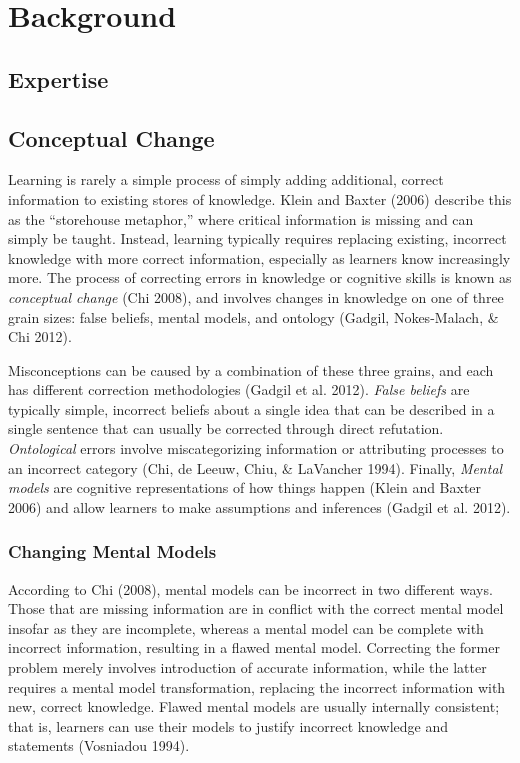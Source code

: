\documentclass{book}
\begin{document}
\chapter{Background}

\section{Expertise}


\section{Conceptual Change}

Learning is rarely a simple process of simply adding additional, correct information to existing stores of knowledge. Klein and Baxter (2006) describe this as the ``storehouse metaphor,'' where critical information is missing and can simply be taught. Instead, learning typically requires replacing existing, incorrect knowledge with more correct information, especially as learners know increasingly more. The process of correcting errors in knowledge or cognitive skills is known as \emph{conceptual change} (Chi 2008), and involves changes in knowledge on one of three grain sizes: false beliefs, mental models, and ontology (Gadgil, Nokes-Malach, & Chi 2012).

Misconceptions can be caused by a combination of these three grains, and each has different correction methodologies (Gadgil et al. 2012). \emph{False beliefs} are typically simple, incorrect beliefs about a single idea that can be described in a single sentence that can usually be corrected through direct refutation. \emph{Ontological} errors involve miscategorizing information or attributing processes to an incorrect category (Chi, de Leeuw, Chiu, & LaVancher 1994). Finally, \emph{Mental models} are cognitive representations of how things happen (Klein and Baxter 2006) and allow learners to make assumptions and inferences (Gadgil et al. 2012).

\subsection{Changing Mental Models}

According to Chi (2008), mental models can be incorrect in two different ways. Those that are missing information are in conflict with the correct mental model insofar as they are incomplete, whereas a mental model can be complete with incorrect information, resulting in a flawed mental model. Correcting the former problem merely involves introduction of accurate information, while the latter requires a mental model transformation, replacing the incorrect information with new, correct knowledge. Flawed mental models are usually internally consistent; that is, learners can use their models to justify incorrect knowledge and statements (Vosniadou 1994).
\end{document}
